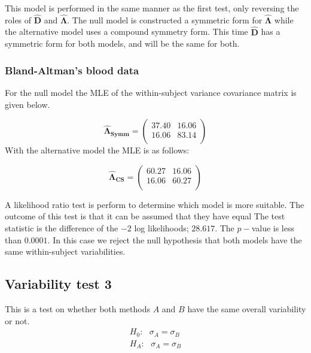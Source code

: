 \documentclass[12pt, a4paper]{report}
\theoremstyle{plain}
\theoremstyle{definition}
\theoremstyle{remark}
\begin{document}
	This model is performed in the same manner as the first test, only reversing the roles of $\boldsymbol{\hat{D}}$ and $\boldsymbol{\hat{\Lambda}}$. The null model is constructed  a symmetric form for $\boldsymbol{\hat{\Lambda}}$ while the alternative model uses a compound symmetry form. This time $\boldsymbol{\hat{D}}$ has a symmetric form for both models, and will be the same for both.
	
	
	\subsubsection{Bland-Altman's blood data}
	For the null model the MLE of the within-subject variance covariance matrix is given below.
	
	\begin{equation}
	\boldsymbol{\hat{\Lambda}_{Symm}} = \left( \begin{array}{cc}
	37.40 & 16.06  \\
	16.06 & 83.14  \\
	\end{array}\right)
	\end{equation}
	With the alternative model the MLE is as follows:
	
	\begin{equation}
	\boldsymbol{\hat{\Lambda}_{CS}} = \left( \begin{array}{cc}
	60.27  & 16.06  \\
	16.06  & 60.27  \\
	\end{array}\right)
	\end{equation}
	
	A likelihood ratio test is perform to determine which model is more suitable.
	The outcome of this test is that it can be assumed that they have equal
	The test statistic is the difference of the $-2$ log likelihoods; $28.617$. The $p-$value is less than $0.0001$. In this case we reject the null hypothesis that both models have the same within-subject variabilities.
	
	\subsection{Variability test 3}
	This is a test on whether both methods $A$ and $B$ have the same overall variability or not.
	\begin{eqnarray}
	H_{0}: \mbox{ }\sigma_{A}  = \sigma_{B} \\
	H_{A}: \mbox{ }\sigma_{A}  = \sigma_{B}
	\end{eqnarray}
	
\end{document}
